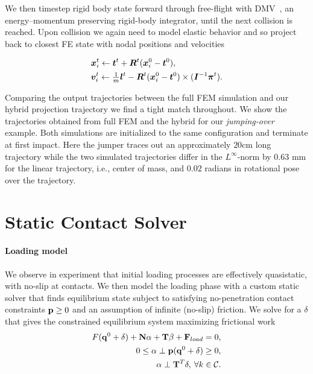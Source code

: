 We then timestep rigid body state forward through free-flight with DMV~\cite{Moser:1991dl}, an energy--momentum preserving rigid-body integrator, until the next collision is reached. Upon collision we again need to model elastic behavior and so project back to closest FE state with nodal positions and velocities 

\begin{align}
\begin{split}
&\bm{x}^t_i \leftarrow \bm{t}^t + \bm{R}^t (\bm{x}^0_i - \bm{t}^0),\\
&\bm{v}^t_i \leftarrow \tfrac{1}{m} \bm{l}^t - \bm{R}^t (\bm{x}^0_i - \bm{t}^0) \times (\bm{I}^{-1}{\bm{\pi}}^t).
\end{split}
\end{align}

Comparing the output trajectories between the full FEM simulation and our hybrid projection trajectory we find a tight match throughout.
We show the trajectories obtained from full FEM and the hybrid for our \emph{jumping-over} example. Both simulations are initialized to the same configuration and terminate at first impact. Here the jumper traces out an approximately $20$cm long trajectory while the two simulated trajectories differ in the $L^{\infty}$-norm by $0.63$ mm for the linear trajectory, i.e., center of mass, and $0.02$ radians in rotational pose over the trajectory.
\section{Static Contact Solver}
\label{sec:iter_static_solver}

\paragraph{Loading model}
We observe in experiment that initial loading processes are effectively quasistatic, with no-slip at contacts. We then model the loading phase with a custom static solver that finds equilibrium state subject to satisfying no-penetration contact constraints $\mathbf {p} \geq 0$ and an assumption of infinite (no-slip) friction. 
We solve for a $ \delta$ that gives the constrained equilibrium system maximizing frictional work
\begin{align}
\begin{split}
F(\mathbf {q}^0 + \delta) + \mathbf {N} \alpha + \mathbf {T} \beta + \mathbf {F}_{load} = 0, \\ 
0 \leq \alpha \perp \mathbf {p}( \mathbf {q}^0 + \delta) \geq 0,\\
\alpha \perp {\mathbf {T}}^T \delta, \> \forall k \in \mathcal{C}.
\end{split}
\label{eq:static_var}
\end{align}

